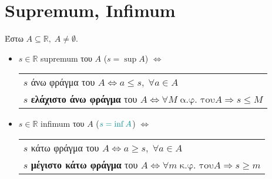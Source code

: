 \section{Supremum, Infimum}

\begin{dfn}
    Έστω $ A \subseteq \mathbb{R}, \; A \neq \emptyset $.
    \begin{itemize}[label=\textcolor{Col1}{\tiny$\blacksquare$}]
        \item $ s \in \mathbb{R} $ \textcolor{Col1}{supremum} του $A$ 
          (\textcolor{Col2}{$s = \sup A $}) 
            $ \Leftrightarrow $ 
            \begin{tabular}[t]{l}
                $s$ άνω φράγμα του $A \Leftrightarrow a \leq s, \; \forall a 
                \in A $ \\
                $s$ \textbf{ελάχιστο άνω φράγμα} του $A  \Leftrightarrow 
                \forall M \; \text{α.φ.\ του} A \Rightarrow s \leq M $
            \end{tabular} 

        \item $ s \in \mathbb{R} $ \textcolor{Col1}{infimum} του $A$ 
            ($ \textcolor{Col2}{s= \inf A} $) 
            $ \Leftrightarrow $ 
            \begin{tabular}[t]{l}
                $s$ κάτω φράγμα του $A \Leftrightarrow a \geq s, \; \forall a 
                \in A $ \\
                $s$ \textbf{μέγιστο κάτω φράγμα} του $A \Leftrightarrow 
                \forall m \; \text{κ.φ.\ του} A \Rightarrow s \geq m $
            \end{tabular} 
    \end{itemize}
\end{dfn}

